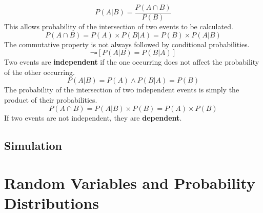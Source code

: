 \documentclass[../AP_Statistics.tex]{subfiles}
\begin{document}
		$$P(A|B) = \frac{P(A\cap B)}{P(B)}$$
		This allows probability of the intersection of two events to be calculated.
		$$P(A\cap B) = P(A) \times P(B|A) = P(B) \times P(A|B)$$
		The commutative property is not always followed by conditional probabilities.
		$$\lnot\square[P(A|B) = P(B|A)]$$
		Two events are \textbf{independent} if the one occurring does not affect the probability of the other occurring.
		$$P(A|B) = P(A) \land P(B|A) = P(B)$$
		The probability of the intersection of two independent events is simply the product of their probabilities.
		$$P(A\cap B) = P(A|B) \times P(B) = P(A) \times P(B)$$
		If two events are not independent, they are \textbf{dependent}.
		\section*{Simulation}
	\chapter{Random Variables and Probability Distributions}
\end{document}
